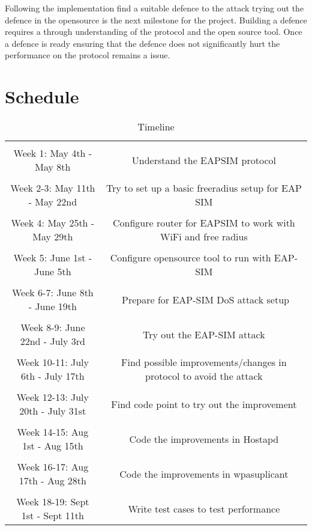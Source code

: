 \documentclass{article}
\begin{document}
Following the implementation find a suitable defence to the attack trying out the defence in the opensource is the next milestone for the project. Building a defence requires a through understanding of the protocol and the open source tool. Once a defence is ready ensuring that the defence does not significantly hurt the performance on the protocol remains a issue.

\section{Schedule}
\label{sec:Section 3}
\begin{table}[ht]
\caption{Timeline}
\centering 
\begin{tabular}{c c}
\hline \hline   
\\               
Week 1: May 4th - May 8th  & Understand the EAP­SIM protocol \\
\\
Week 2-3: May 11th - May 22nd  & Try to set up a basic freeradius setup for EAP SIM \\
\\
Week 4: May 25th - May 29th & Configure router for EAP­SIM to work with WiFi and free radius \\
\\
Week 5: June 1st - June 5th  & Configure opensource tool to run with EAP-SIM \\
\\
Week 6-7: June 8th - June 19th  & ­ Prepare for EAP-SIM DoS attack setup \\
\\
Week 8-9: June 22nd - July 3rd & Try out the EAP-SIM attack \\
\\
Week 10-11: July 6th - July 17th  & Find possible improvements/changes in protocol to avoid the attack \\ 
\\
Week 12-13: July 20th - July 31st & Find code point to try out the improvement \\
\\
Week 14-15: Aug 1st - Aug 15th  & Code the improvements in Hostapd \\
\\
Week 16-17: Aug 17th - Aug 28th & Code the improvements in wpasuplicant \\
\\
Week 18-19: Sept 1st - Sept 11th  &  Write test cases to test performance \\

\end{tabular}
\end{table}
\end{document}
